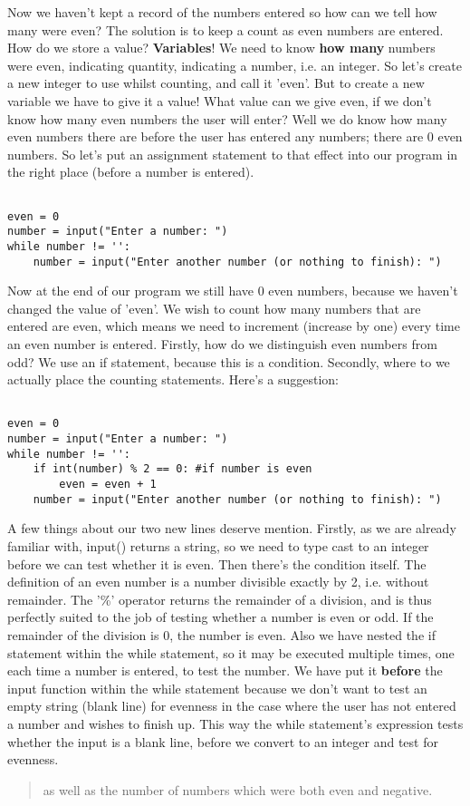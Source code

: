 Now we haven't kept a record of the numbers entered so how can we   tell how many were even? The solution is to keep a count as even   numbers are entered. How do we store a value?   \textbf{Variables}! We need to know \textbf{how many}   numbers were even, indicating quantity, indicating a number, i.e. an   integer. So let's create a new integer to use whilst counting, and call   it 'even'. But to create a new variable we have to give it a value!   What value can we give even, if we don't know how many even numbers the   user will enter? Well we do know how many even numbers there are before   the user has entered any numbers; there are 0 even numbers. So let's   put an assignment statement to that effect into our program in the   right place (before a number is entered).
\begin{lstlisting}

even = 0
number = input("Enter a number: ")
while number != '':
    number = input("Enter another number (or nothing to finish): ")
\end{lstlisting}

Now at the end of our program we still have 0 even numbers, because   we haven't changed the value of 'even'. We wish to count how many   numbers that are entered are even, which means we need to increment   (increase by one) every time an even number is entered. Firstly, how do   we distinguish even numbers from odd? We use an if statement, because   this is a condition. Secondly, where to we actually place the counting   statements. Here's a suggestion:
\begin{lstlisting}

even = 0
number = input("Enter a number: ")
while number != '':
    if int(number) % 2 == 0: #if number is even
        even = even + 1
    number = input("Enter another number (or nothing to finish): ")
\end{lstlisting}

A few things about our two new lines deserve mention. Firstly, as we   are already familiar with, input() returns a string, so we need to   type cast to an integer before we can test whether it is even. Then   there's the condition itself. The definition of an even number is a   number divisible exactly by 2, i.e. without remainder. The '\%' operator   returns the remainder of a division, and is thus perfectly suited to   the job of testing whether a number is even or odd. If the remainder of   the division is 0, the number is even. Also we have nested the if   statement within the while statement, so it may be executed multiple   times, one each time a number is entered, to test the number. We have   put it \textbf{before} the input function within the while   statement because we don't want to test an empty string (blank line)   for evenness in the case where the user has not entered a number and   wishes to finish up. This way the while statement's expression tests   whether the input is a blank line, before we convert to an integer and   test for evenness.
\begin{quotation}    as well as the number of numbers which were both even and negative.   
\end{quotation}


